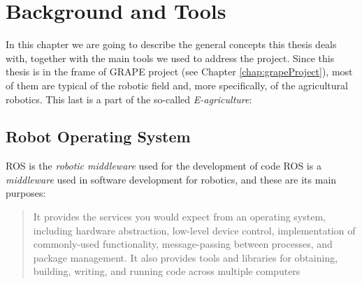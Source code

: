 
\chapter{Background and Tools} \label{chap:backgroundAndToolsChapter}

In this chapter we are going to describe the general concepts this thesis deals with, together with the main tools we used to address the project. Since this thesis is in the frame of \ac{GRAPE} project (see Chapter \ref{chap:grapeProject}),  most of them are typical of the robotic field and, more specifically, of the agricultural robotics. This last is a part of the so-called \textit{E-agriculture}: 


\section{Robot Operating System}\label{sec:robotOperatingSystem}
\ac{ROS} is the \textit{robotic middleware} used for the development of code 
\ac{ROS} is a \textit{middleware} used in software development for robotics, and these are its main purposes: 
\blockquote{
It provides the services you would expect from an operating system, including hardware abstraction, low-level device control, implementation of commonly-used functionality, message-passing between processes, and package management. It also provides tools and libraries for obtaining, building, writing, and running code across multiple computers %
} 

